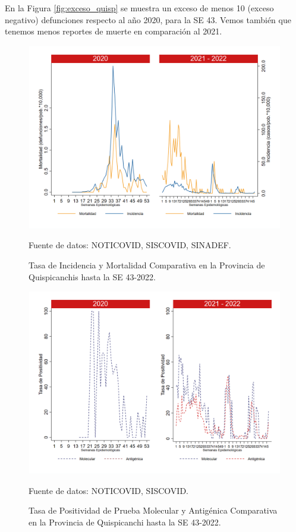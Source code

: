 \documentclass[12pt,a4paper,openany]{book}
\begin{document}
	En la Figura \ref{fig:exceso_quisp} se muestra un exceso de menos 10 (exceso negativo) defunciones respecto al año 2020, para la SE 43. Vemos también que tenemos menos reportes de muerte en comparación al 2021. 
	
	\begin{figure}[h]
		\caption{Tasa de Incidencia y Mortalidad Comparativa en la Provincia de Quispicanchis hasta la SE 43-2022.}\label{fig:inc_mort_quisp}
		\begin{center}
			\includegraphics[width=0.85\linewidth]{../figuras/incidencia_mortalidad_20_21_12.png}
		\end{center}
		{\footnotesize {Fuente de datos: NOTICOVID, SISCOVID, SINADEF.}}
	\end{figure}
	
	\begin{figure}[h]
		\caption{Tasa de Positividad de Prueba Molecular y Antigénica Comparativa en la Provincia de Quispicanchi hasta la SE 43-2022.}\label{fig:positividad_quisp}
		\begin{center}
			\includegraphics[width=0.7\linewidth]{../figuras/positividad_20_21_12.png}
		\end{center}
		{\footnotesize {Fuente de datos: NOTICOVID, SISCOVID.}}
	\end{figure}
	
\end{document}
